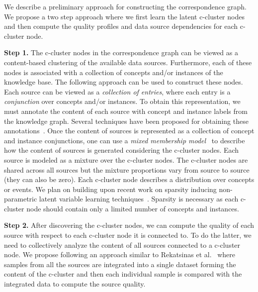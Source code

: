 \documentclass{sig-alternate}
\begin{document}
We describe a preliminary approach for constructing the correspondence graph. We propose a two step approach where we first learn the latent c-cluster nodes and then compute the quality profiles and data source dependencies for each c-cluster node. 

\vspace{3pt} \noindent\textbf{Step 1.} The c-cluster nodes in the correspondence graph can be viewed as a content-based clustering of the available data sources. Furthermore, each of these nodes is associated with a collection of concepts and/or instances of the knowledge base. The following approach can be used to construct these nodes. Each source can be viewed as a {\em collection of entries}, where each entry is a {\em conjunction} over concepts and/or instances. To obtain this representation, we must annotate the content of each source with concept and instance labels from the knowledge graph. Several techniques have been proposed for obtaining these annotations~\cite{spotlight,limaye:2010}. Once the content of sources is represented as a collection of concept and instance conjunctions, one can use a {\em mixed membership model}~\cite{blei:2003} to describe how the content of sources is generated considering the c-cluster nodes. Each source is modeled as a mixture over the c-cluster nodes. The c-cluster nodes are shared across all sources but the mixture proportions vary from source to source (they can also be zero). Each c-cluster node describes a distribution over concepts or events. We plan on building upon recent work on sparsity inducing non-parametric latent variable learning techniques~\cite{elidan:2005, sdm:2013}. Sparsity is necessary as each c-cluster node should contain only a limited number of concepts and instances. 

\vspace{3pt} \noindent\textbf{Step 2.} After discovering the c-cluster nodes, we can compute the quality of each source with respect to each c-cluster node it is connected to. To do the latter, we need to collectively analyze the content of all sources connected to a c-cluster node. We propose following an approach similar to Rekatsinas et al.~\cite{rekatsinas:2014} where samples from all the sources are integrated into a single dataset forming the content of the c-cluster and then each individual sample is compared with the integrated data to compute the source quality. 
\end{document}
